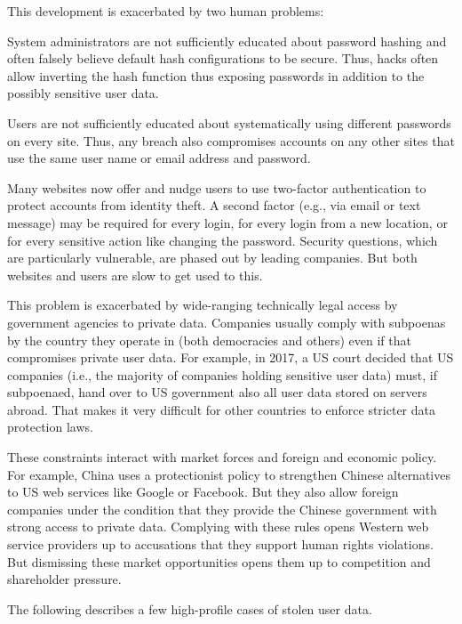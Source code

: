 This development is exacerbated by two human problems:
\begin{compactitem}
 \item System administrators are not sufficiently educated about password hashing and often falsely believe default hash configurations to be secure.
 Thus, hacks often allow inverting the hash function thus exposing passwords in addition to the possibly sensitive user data.
 \item Users are not sufficiently educated about systematically using different passwords on every site.
 Thus, any breach also compromises accounts on any other sites that use the same user name or email address and password.
\end{compactitem}

Many websites now offer and nudge users to use two-factor authentication to protect accounts from identity theft.
A second factor (e.g., via email or text message) may be required for every login, for every login from a new location, or for every sensitive action like changing the password.
Security questions, which are particularly vulnerable, are phased out by leading companies.
But both websites and users are slow to get used to this.
\medskip

This problem is exacerbated by wide-ranging technically legal access by government agencies to private data.
Companies usually comply with subpoenas by the country they operate in (both democracies and others) even if that compromises private user data.
For example, in 2017, a US court decided that US companies (i.e., the majority of companies holding sensitive user data) must, if subpoenaed, hand over to US government also all user data stored on servers abroad.
That makes it very difficult for other countries to enforce stricter data protection laws.

These constraints interact with market forces and foreign and economic policy.
For example, China uses a protectionist policy to strengthen Chinese alternatives to US web services like Google or Facebook.
But they also allow foreign companies under the condition that they provide the Chinese government with strong access to private data.
Complying with these rules opens Western web service providers up to accusations that they support human rights violations.
But dismissing these market opportunities opens them up to competition and shareholder pressure.
\medskip

The following describes a few high-profile cases of stolen user data.


